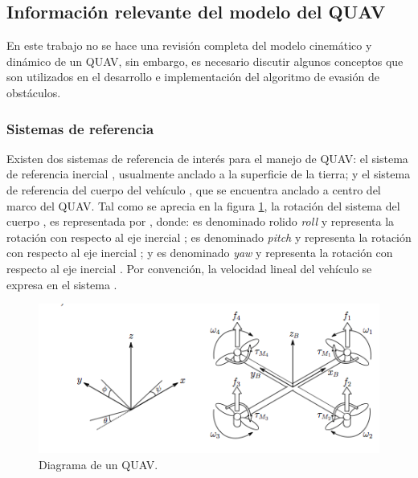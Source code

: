 \subsection{Información relevante del modelo del QUAV}

En este trabajo no se hace una revisión completa del modelo cinemático y dinámico de un QUAV, sin embargo, es necesario discutir algunos conceptos que son utilizados en el desarrollo e implementación del algoritmo de evasión de obstáculos.

\subsubsection{Sistemas de referencia}

Existen dos sistemas de referencia de interés para el manejo de QUAV: el sistema de referencia inercial , usualmente anclado a la superficie de la tierra; y el sistema de referencia del cuerpo del vehículo , que se encuentra anclado a centro del marco del QUAV. Tal como se aprecia en la figura \ref{fig:QUAV-model}, la rotación del sistema del cuerpo , es representada por \jim{\phi,\theta,\psi} \cite{multidrone2015modeling}, donde: \jim{\phi} es denominado rolido \textit{roll} y representa la rotación con respecto al eje inercial ; \jim{\theta} es denominado \textit{pitch} y representa la rotación con respecto al eje inercial ; y \jim{\psi} es denominado \textit{yaw} y representa la rotación con respecto al eje inercial . Por convención, la velocidad lineal del vehículo  se expresa en el sistema .

\begin{figure}[H]
    \centering
    \includegraphics[scale=0.65]{partes/img/QUAV-model.png}
    \caption[Diagrama de un QUAV.]{Diagrama de un QUAV\footnotemark.} 
    \label{fig:QUAV-model}
\end{figure}

